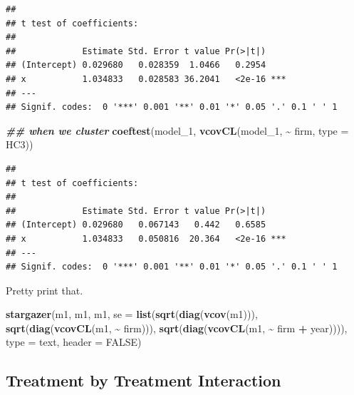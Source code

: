 \documentclass[
]{article}
\newenvironment{Shaded}{\begin{snugshade}}{\end{snugshade}}
\newcommand{\AttributeTok}[1]{\textcolor[rgb]{0.13,0.29,0.53}{#1}}
\newcommand{\ConstantTok}[1]{\textcolor[rgb]{0.56,0.35,0.01}{#1}}
\newcommand{\DocumentationTok}[1]{\textcolor[rgb]{0.56,0.35,0.01}{\textbf{\textit{#1}}}}
\newcommand{\FunctionTok}[1]{\textcolor[rgb]{0.13,0.29,0.53}{\textbf{#1}}}
\newcommand{\NormalTok}[1]{#1}
\newcommand{\SpecialCharTok}[1]{\textcolor[rgb]{0.81,0.36,0.00}{\textbf{#1}}}
\newcommand{\StringTok}[1]{\textcolor[rgb]{0.31,0.60,0.02}{#1}}
\theoremstyle{definition}
\theoremstyle{definition}
\theoremstyle{definition}
\theoremstyle{definition}
\theoremstyle{remark}
\begin{document}
\begin{verbatim}
## 
## t test of coefficients:
## 
##             Estimate Std. Error t value Pr(>|t|)    
## (Intercept) 0.029680   0.028359  1.0466   0.2954    
## x           1.034833   0.028583 36.2041   <2e-16 ***
## ---
## Signif. codes:  0 '***' 0.001 '**' 0.01 '*' 0.05 '.' 0.1 ' ' 1
\end{verbatim}

\begin{Shaded}
\begin{Highlighting}[]
\DocumentationTok{\#\# when we cluster}
\FunctionTok{coeftest}\NormalTok{(model\_1, }\FunctionTok{vcovCL}\NormalTok{(model\_1, }\SpecialCharTok{\textasciitilde{}}\NormalTok{ firm, }\AttributeTok{type =} \StringTok{\textquotesingle{}HC3\textquotesingle{}}\NormalTok{))}
\end{Highlighting}
\end{Shaded}

\begin{verbatim}
## 
## t test of coefficients:
## 
##             Estimate Std. Error t value Pr(>|t|)    
## (Intercept) 0.029680   0.067143   0.442   0.6585    
## x           1.034833   0.050816  20.364   <2e-16 ***
## ---
## Signif. codes:  0 '***' 0.001 '**' 0.01 '*' 0.05 '.' 0.1 ' ' 1
\end{verbatim}

Pretty print that.

\begin{Shaded}
\begin{Highlighting}[]
\FunctionTok{stargazer}\NormalTok{(m1, m1, m1,}
          \AttributeTok{se =} \FunctionTok{list}\NormalTok{(}\FunctionTok{sqrt}\NormalTok{(}\FunctionTok{diag}\NormalTok{(}\FunctionTok{vcov}\NormalTok{(m1))), }
                    \FunctionTok{sqrt}\NormalTok{(}\FunctionTok{diag}\NormalTok{(}\FunctionTok{vcovCL}\NormalTok{(m1, }\SpecialCharTok{\textasciitilde{}}\NormalTok{ firm))), }
                    \FunctionTok{sqrt}\NormalTok{(}\FunctionTok{diag}\NormalTok{(}\FunctionTok{vcovCL}\NormalTok{(m1, }\SpecialCharTok{\textasciitilde{}}\NormalTok{ firm }\SpecialCharTok{+}\NormalTok{ year)))),}
          \AttributeTok{type =} \StringTok{\textquotesingle{}text\textquotesingle{}}\NormalTok{,}
          \AttributeTok{header =} \ConstantTok{FALSE}\NormalTok{)}
\end{Highlighting}
\end{Shaded}

\subsection{Treatment by Treatment Interaction}\label{treatment-by-treatment-interaction}
\end{document}
